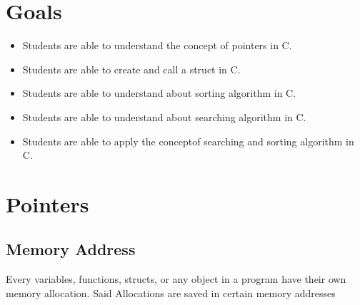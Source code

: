 \section{Goals}
\begin{itemize}[label=$\bullet$, itemsep=-1pt, leftmargin=*]
    \item Students are able to understand the concept of pointers in C.
    \item Students are able to create and call a struct in C.
    \item Students are able to understand about sorting algorithm in C.
    \item Students are able to understand about searching algorithm in C.
    \item Students are able to apply the conceptof searching and sorting algorithm in C.
\end{itemize}

\section{Pointers}
\subsection{Memory Address}
Every variables, functions, structs, or any object in a program have their own memory allocation.
Said Allocations are saved in certain memory addresses

